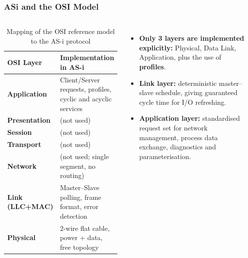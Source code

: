 \begin{frame}
	\frametitle{ASi and the OSI Model}
	\begin{columns}[T,totalwidth=\textwidth]
			\begin{table}
				\centering
				\begin{tabular}{@{}>{\bfseries}m{} m{}@{}}
					\toprule
					\textbf{OSI Layer} & \textbf{Implementation in AS-i} \\
					\midrule
					Application    & Client/Server requests, profiles, cyclic and acyclic services \\
					Presentation   & (not used) \\
					Session        & (not used) \\
					Transport      & (not used) \\
					Network        & (not used; single segment, no routing) \\
					Link (LLC+MAC) & Master--Slave polling, frame format, error detection \\
					Physical       & 2-wire flat cable, power + data, free topology \\
					\bottomrule
				\end{tabular}
				\caption{Mapping of the OSI reference model to the AS-i protocol}
				\label{tab:asi_osi_layers}
			\end{table}
			\begin{itemize}
				\item \textbf{Only 3 layers are implemented explicitly:}
					Physical, Data Link, Application, plus the use of \textbf{profiles}.
				\item \textbf{Link layer:}
					deterministic master–slave schedule, giving guaranteed cycle time for I/O refreshing.
				\item \textbf{Application layer:}
					standardised request set for network management, process data exchange, diagnostics and parameterisation.
			\end{itemize}
	\end{columns}
\end{frame}

